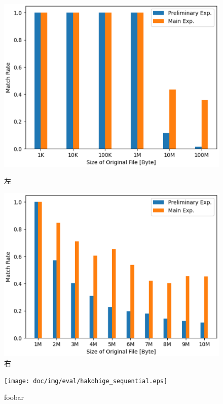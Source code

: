 \begin{figure}[h]
  \centering
  \begin{minipage}[b]{0.49\columnwidth}
    \centering
    \includegraphics[width=\columnwidth]{doc/img/eval/seqential_vs_parallel_match_p4_exp.eps}
    \caption{左}
    \label{fig:seq-vs-par-exp}
  \end{minipage}
  \begin{minipage}[b]{0.49\columnwidth}
    \centering
    \includegraphics[width=\columnwidth]{doc/img/eval/seqential_vs_parallel_match_p4_inc.eps}
    \caption{右}
    \label{fig:seq-vs-par-inc}
  \end{minipage}
\end{figure}

\begin{figure}[t]
  \begin{center}
    \texttt{[image: doc/img/eval/hakohige\_sequential.eps]}
  \end{center}
  \caption{foobar}
  \label{fig:elapsed-time}
\end{figure}

